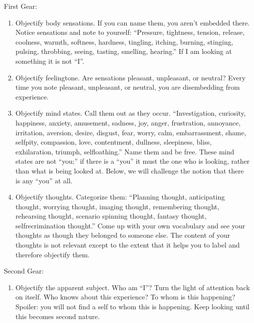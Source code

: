 \documentclass[a5paper,10pt,english]{book}
\begin{document}
\sphinxAtStartPar
First Gear:
\begin{enumerate}
%
\item {} 
\sphinxAtStartPar
Objectify body sensations. If you can name them, you
aren’t embedded there. Notice sensations and note to yourself:
“Pressure, tightness, tension, release, coolness, warmth, softness,
hardness, tingling, itching, burning, stinging, pulsing, throbbing,
seeing, tasting, smelling, hearing.” If I am looking at something it is
not “I”.

\item {} 
\sphinxAtStartPar
Objectify feeling\sphinxhyphen{}tone. Are sensations pleasant, unpleasant,
or neutral? Every time you note pleasant, unpleasant, or neutral, you
are dis\sphinxhyphen{}embedding from experience.

\item {} 
\sphinxAtStartPar
Objectify mind states. Call them
out as they occur. “Investigation, curiosity, happiness, anxiety,
amusement, sadness, joy, anger, frustration, annoyance, irritation,
aversion, desire, disgust, fear, worry, calm, embarrassment, shame,
self\sphinxhyphen{}pity, compassion, love, contentment, dullness, sleepiness, bliss,
exhilaration, triumph, self\sphinxhyphen{}loathing.” Name them and be free. These mind
states are not “you;” if there is a “you” it must the one who is
looking, rather than what is being looked at. Below, we will challenge
the notion that there is any “you” at all.

\item {} 
\sphinxAtStartPar
Objectify thoughts.
Categorize them: “Planning thought, anticipating thought, worrying
thought, imaging thought, remembering thought, rehearsing thought,
scenario spinning thought, fantasy thought, self\sphinxhyphen{}recrimination thought.”
Come up with your own vocabulary and see your thoughts as though they
belonged to someone else. The content of your thoughts is not relevant
except to the extent that it helps you to label and therefore objectify
them.

\end{enumerate}

\sphinxAtStartPar
Second Gear:
\begin{enumerate}
%
\item {} 
\sphinxAtStartPar
Objectify the apparent subject. Who am “I”? Turn the
light of attention back on itself. Who knows about this experience? To
whom is this happening? Spoiler: you will not find a self to whom this
is happening. Keep looking until this becomes second nature.

\end{enumerate}
\end{document}
